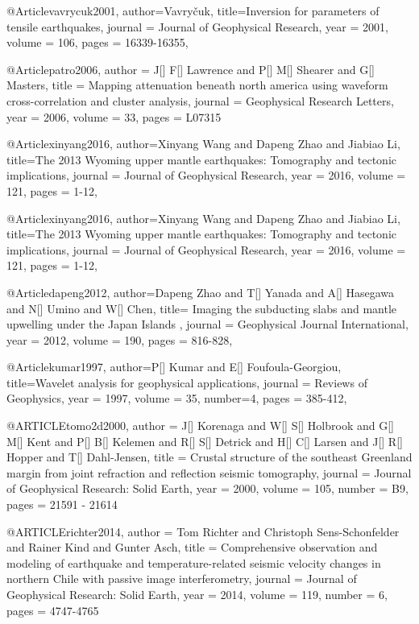 @Article{vavrycuk2001,
  author={Vavry\v{c}uk},
  title={Inversion for parameters of tensile earthquakes},
  journal = 	 {Journal of Geophysical Research},
  year = 	 2001,
  volume =	 106,
  pages =	 {16339-16355},
}

@Article{patro2006,
  author = 	 {J[] F[] Lawrence and P[] M[] Shearer and G[] Masters},
  title = 	 {Mapping attenuation beneath north america using waveform cross-correlation and cluster analysis},
  journal = 	 {Geophysical Research Letters},
  year = 	 2006,
  volume = 33,
  pages =	 {L07315}
}

@Article{xinyang2016,
  author={Xinyang Wang and Dapeng Zhao and Jiabiao Li},
  title={The 2013 Wyoming upper mantle earthquakes: Tomography and tectonic implications},
  journal = 	 {Journal of Geophysical Research},
  year = 	 2016,
  volume =	 121,
  pages =	 {1-12},
}


@Article{xinyang2016,
  author={Xinyang Wang and Dapeng Zhao and Jiabiao Li},
  title={The 2013 Wyoming upper mantle earthquakes: Tomography and tectonic implications},
  journal = 	 {Journal of Geophysical Research},
  year = 	 2016,
  volume =	 121,
  pages =	 {1-12},
}

@Article{dapeng2012,
  author={Dapeng Zhao and T[] Yanada and A[] Hasegawa and N[] Umino and W[] Chen},
  title={ Imaging the subducting slabs and mantle upwelling under the Japan Islands },
  journal = 	 {Geophysical Journal International},
  year = 	 2012,
  volume =	 190,
  pages =	 {816-828},
}


@Article{kumar1997,
  author={P[] Kumar and E[] Foufoula-Georgiou},
  title={Wavelet analysis for geophysical applications},
  journal = 	 {Reviews of Geophysics},
  year = 	 1997,
  volume =	 35,
  number=4,
  pages =	 {385-412},
}

@ARTICLE{tomo2d2000,
  author = {J[] Korenaga and W[] S[] Holbrook and G[] M[] Kent and P[] B[] Kelemen and R[] S[] Detrick and H[] C[] Larsen and J[] R[] Hopper and T[] Dahl-Jensen},
  title = {Crustal structure of the southeast Greenland margin from joint refraction and reflection seismic tomography},
  journal = {Journal of Geophysical Research: Solid Earth},
  year = {2000},
  volume = {105},
  number = B9,
  pages = {21591 - 21614}
}

@ARTICLE{richter2014,
  author = {Tom Richter and Christoph Sens-Schonfelder and  Rainer Kind and Gunter Asch},
  title = {Comprehensive observation and modeling of earthquake and temperature-related seismic velocity changes in northern Chile with passive image interferometry},
  journal = {Journal of Geophysical Research: Solid Earth},
  year = {2014},
  volume = {119},
  number = 6,
  pages = {4747-4765}
}



